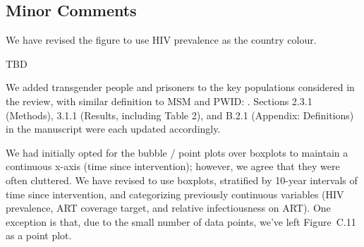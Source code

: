 \subsection{Minor Comments}
\begin{comment}
Figure 2: I would prefer HIV prevalence over PLHIV as the chloropleth.
\end{comment}
\begin{response}
We have revised the figure to use HIV prevalence as the country colour.
\end{response}
\begin{comment}
Do any studies address the age distribution of key populations? This would be useful to include.
\end{comment}
\begin{response}
TBD
\end{response}
\begin{comment}
Were transgender people or prisoners included in any studies?
\end{comment}
\begin{response}
We added transgender people and prisoners to the key populations considered in the review,
with similar definition to MSM and PWID:
.
Sections 2.3.1 (Methods), 3.1.1 (Results, including Table 2), and B.2.1 (Appendix: Definitions)
in the manuscript were each updated accordingly.
\end{response}
\begin{comment}
I find the bubble plots difficult to interpret. The bubbles are often similarly sized, I'm not sure the extra information adds to the results and crowds the plot. Perhaps grouped bar charts or grouped box plots would be easier to read - particularly for Figure 3.
\end{comment}
\begin{response}
We had initially opted for the bubble / point plots over boxplots
to maintain a continuous x-axis (time since intervention);
however, we agree that they were often cluttered.
We have revised to use boxplots,
stratified by 10-year intervals of time since intervention,
and categorizing previously continuous variables
(HIV prevalence, ART coverage target, and relative infectiousness on ART).
One exception is that, due to the small number of data points,
we've left Figure~C.11 as a point plot.
\end{response}
\begin{comment}
Consider inserting Table C.1 into the main text
\end{comment}
